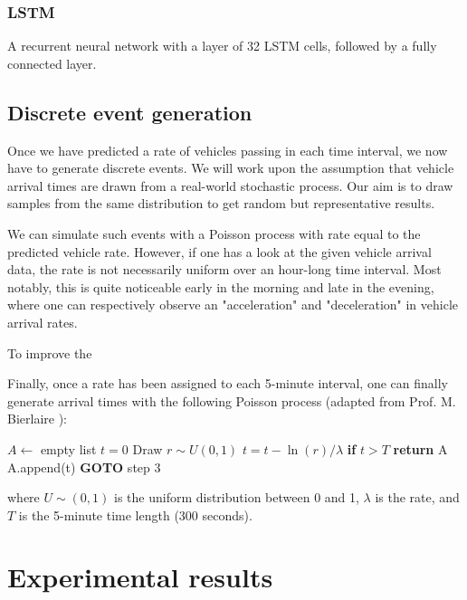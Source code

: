 \documentclass[10pt,conference,compsocconf]{IEEEtran}
\begin{document}
\subsubsection{LSTM}

A recurrent neural network with a layer of 32 LSTM cells, followed by a fully connected layer.


\subsection{Discrete event generation}

Once we have predicted a rate of vehicles passing in each time interval, we now have to generate discrete events. We will work upon the assumption that vehicle arrival times are drawn from a real-world stochastic process. Our aim is to draw samples from the same distribution to get random but representative results.

We can simulate such events with a Poisson process \cite{poisson} with rate equal to the predicted vehicle rate. However, if one has a look at the given vehicle arrival data, the rate is not necessarily uniform over an hour-long time interval. Most notably, this is quite noticeable early in the morning and late in the evening, where one can respectively observe an "acceleration" and "deceleration" in vehicle arrival rates.

To improve the

Finally, once a rate has been assigned to each 5-minute interval, one can finally generate arrival times with the following Poisson process (adapted from Prof. M. Bierlaire \cite{poisson}):
\begin{algorithmic}[1]
    \State $A \gets $ empty list
    \State $t = 0$
    \State Draw $r \sim U(0,1)$
    \State $t = t - \ln(r) / \lambda$
    \State \textbf{if} $t > T$ \textbf{return} A
    \State A.append(t)
    \State \textbf{GOTO} step 3
\end{algorithmic}

where $U\sim(0,1)$ is the uniform distribution between 0 and 1, $\lambda$ is the rate, and $T$ is the 5-minute time length ($300$ seconds).



\section{Experimental results}
\end{document}
